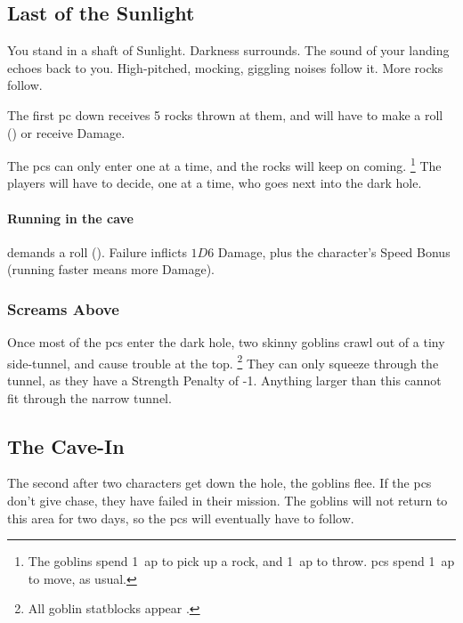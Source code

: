 \begin{multicols}{2}

\subsection{Last of the Sunlight}

\begin{boxtext}
  You stand in a shaft of Sunlight.
  Darkness surrounds.
  The sound of your landing echoes back to you.
  High-pitched, mocking, giggling noises follow it.
  More rocks follow.
\end{boxtext}

The first \gls{pc} down receives 5 rocks thrown at them, and will have to make a  roll (\tn[10]) or receive  Damage.

The \glspl{pc} can only enter one at a time, and the rocks will keep on coming.%
\footnote{The goblins spend 1~\gls{ap} to pick up a rock, and 1~\gls{ap} to throw.
\Glspl{pc} spend 1~\gls{ap} to move, as usual.}
The players will have to decide, one at a time, who goes next into the dark hole.

\paragraph{Running in the cave}
demands a  roll (\tn[12]).
Failure inflicts $1D6$ Damage, plus the character's Speed Bonus (running faster means more Damage).

\subsubsection{Screams Above}

Once most of the \glspl{pc} enter the dark hole, two skinny goblins crawl out of a tiny side-tunnel, and cause trouble at the top.%
\footnote{All goblin statblocks appear .}
They can only squeeze through the tunnel, as they have a Strength Penalty of -1.
Anything larger than this cannot fit through the narrow tunnel.

\subsection{The Cave-In}

The second after two characters get down the hole, the goblins flee.
If the \glspl{pc} don't give chase, they have failed in their mission.
The goblins will not return to this area for two days, so the \glspl{pc} will eventually have to follow.


\end{multicols}
